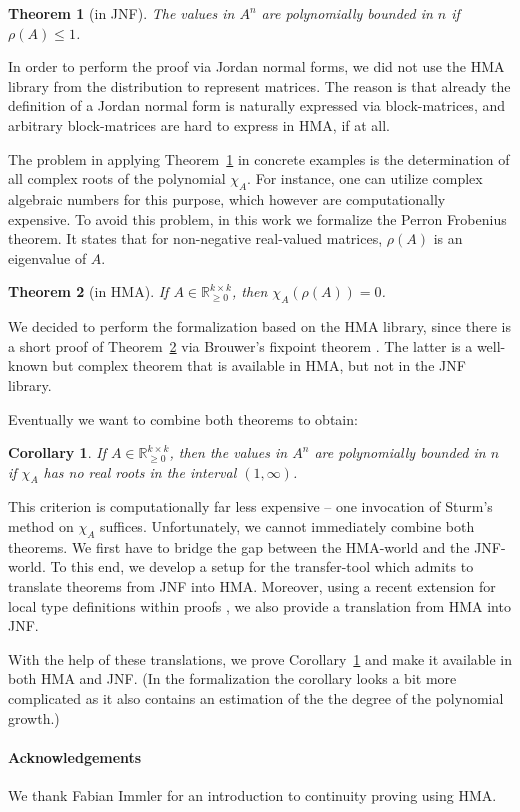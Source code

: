 \documentclass[11pt,a4paper]{article}
\newtheorem{theorem}{Theorem}%
\newtheorem{corollary}{Corollary}%
\newcommand\reals{\mathbb{R}}
\begin{document}
\begin{theorem}[in JNF]
\label{sr}
The values in $A^n$ are polynomially bounded in $n$ if $\rho(A) \leq 1$.
\end{theorem}

In order to perform the proof via Jordan normal forms, we did not use the HMA library from the distribution
to represent matrices. The reason is that already the definition of a Jordan normal form is naturally
expressed via block-matrices, and arbitrary block-matrices are hard to express in HMA, if at all.

The problem in applying Theorem~\ref{sr} in concrete examples is the determination of all
complex roots of the polynomial $\chi_A$. For instance, one can utilize complex algebraic numbers 
for this purpose, which however are computationally expensive. To avoid this problem, in this work we 
formalize the Perron Frobenius theorem. It states that for non-negative real-valued matrices,
$\rho(A)$ is an eigenvalue of $A$.

\begin{theorem}[in HMA]
\label{pf}
If $A \in \reals_{\geq 0}^{k \times k}$, then $\chi_A(\rho(A)) = 0$.
\end{theorem}

We decided to perform the formalization based on the HMA library, since there is a short proof
of Theorem~\ref{pf} via Brouwer's fixpoint theorem \cite[Section 5.2]{SerreMatrices}. The latter is a well-known but complex theorem 
that is available in HMA, but not in the JNF library.

Eventually we want to combine both theorems to obtain:
\begin{corollary}
\label{final}
If $A \in \reals_{\geq 0}^{k \times k}$, then the values in $A^n$ are polynomially bounded in
$n$ if $\chi_A$ has no real roots in the interval $(1,\infty)$. 
\end{corollary}

This criterion is computationally far less expensive -- one invocation of Sturm's method 
on $\chi_A$ suffices. Unfortunately, we cannot immediately combine both theorems. We first have to bridge
the gap between the HMA-world and the JNF-world. To this end, we develop a setup for the transfer-tool
which admits to translate theorems from JNF into HMA. Moreover, using a recent extension for local type
definitions within proofs \cite{LTD}, we also provide a translation from HMA into JNF. 


With the help of these translations, we prove Corollary~\ref{final} and make it available in
both HMA and JNF. (In the formalization the corollary looks a bit more complicated as it also
contains an estimation of the the degree of the polynomial growth.)



\paragraph*{Acknowledgements}
We thank Fabian Immler for an introduction to continuity proving using HMA.



\end{document}
